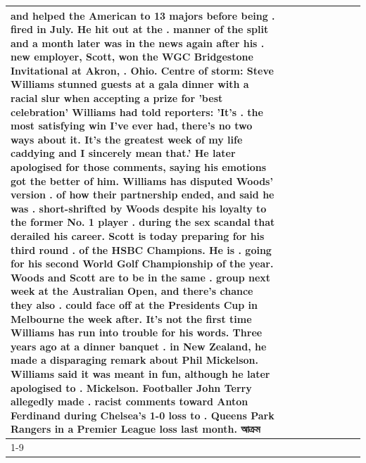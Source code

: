 \begin{table}[H]
\begin{tabular}{lllrlllll}
and helped the American to 13 majors before being . fired in July. He hit out at the . manner of the split and a month later was in the news again after his . new employer, Scott, won the WGC Bridgestone Invitational at Akron, . Ohio. Centre of storm: Steve Williams stunned guests at a gala dinner with a racial slur when accepting a prize for 'best celebration' Williams had told reporters: 'It's . the most satisfying win I've ever had, there's no two ways about it. It's the greatest week of my life caddying and I sincerely mean that.' He later apologised for those comments, saying his emotions got the better of him. Williams has disputed Woods' version . of how their partnership ended, and said he was . short-shrifted by Woods despite his loyalty to the former No. 1 player . during the sex scandal that derailed his career. Scott is today preparing for his third round . of the HSBC Champions. He is . going for his second World Golf Championship of the year. Woods and Scott are to be in the same . group next week at the Australian Open, and there's chance they also . could face off at the Presidents Cup in Melbourne the week after. It's not the first time Williams has run into trouble for his words. Three years ago at a dinner banquet . in New Zealand, he made a disparaging remark about Phil Mickelson. Williams said it was meant in fun, although he later apologised to . Mickelson. Footballer John Terry allegedly made . racist comments toward Anton Ferdinand during Chelsea's 1-0 loss to . Queens Park Rangers in a Premier League loss last month. আক্রম \\
\cline{1-9}

\end{tabular}
\end{table}

